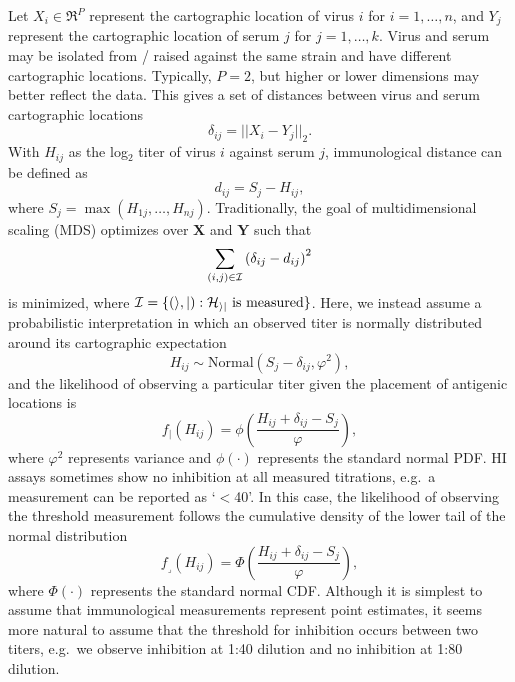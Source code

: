 \documentclass[11pt,oneside,letterpaper]{article}
\newcommand{\point}{f_{\scriptscriptstyle \vert}}	%
\newcommand{\threshold}{f_{\textstyle \lrcorner}}	%
\newcommand{\mdssd}{\varphi}						%
\newcommand{\vn}{n}									%
\newcommand{\sn}{k}									%
\begin{document}
Let $X_i \in \Re^{P}$ represent the cartographic location of virus $i$ for $i = 1,\ldots,\vn$, and $Y_j$ represent the cartographic location of serum $j$ for $j = 1,\ldots,\sn$.
Virus and serum may be isolated from / raised against the same strain and have different cartographic locations.
Typically, $P = 2$, but higher or lower dimensions may better reflect the data.  
This gives a set of distances between virus and serum cartographic locations 
\begin{equation}
	\delta_{ij} =  || X_i - Y_j ||_2.
\end{equation}
With $H_{ij}$ as the log$_2$ titer of virus $i$ against serum $j$, immunological distance can be defined as
\begin{equation}
	d_{ij} =  S_j - H_{ij},
\end{equation}
where $S_j = \max ( H_{1j},\ldots,H_{\vn j} )$.
Traditionally, the goal of multidimensional scaling (MDS) optimizes over $\mathbf{X}$ and $\mathbf{Y}$ such that
\begin{equation}
	\sum_{(i,j) \in \cal I} 
	\left(
		\delta_{ij} - d_{ij}
	\right)^2
\end{equation}
is minimized, where $\cal I = \{ (i,j) : H_{ij} \mbox{ is measured} \}$. 
Here, we instead assume a probabilistic interpretation in which an observed titer is normally distributed around its cartographic expectation
\begin{equation} 
	H_{ij} \sim \mbox{Normal}( S_j - \delta_{ij}, \mdssd^2 ),
\end{equation}
and the likelihood of observing a particular titer given the placement of antigenic locations is 
\begin{equation} 
	\point(H_{ij}) = \phi \left( \frac{ H_{ij} + \delta_{ij} - S_j }{ \mdssd } \right),
\end{equation}
where $\mdssd^2$ represents variance and $\phi(\cdot)$ represents the standard normal PDF.
HI assays sometimes show no inhibition at all measured titrations, e.g.\ a measurement can be reported as `$<$40'.
In this case, the likelihood of observing the threshold measurement follows the cumulative density of the lower tail of the normal distribution
\begin{equation} 
	\threshold(H_{ij}) = \Phi \left( \frac{ H_{ij} + \delta_{ij} - S_j }{ \mdssd } \right),
\end{equation}
where $\Phi(\cdot)$ represents the standard normal CDF.
Although it is simplest to assume that immunological measurements represent point estimates, it seems more natural to assume that the threshold for inhibition occurs between two titers, e.g.\ we observe inhibition at 1:40 dilution and no inhibition at 1:80 dilution.
\end{document}
